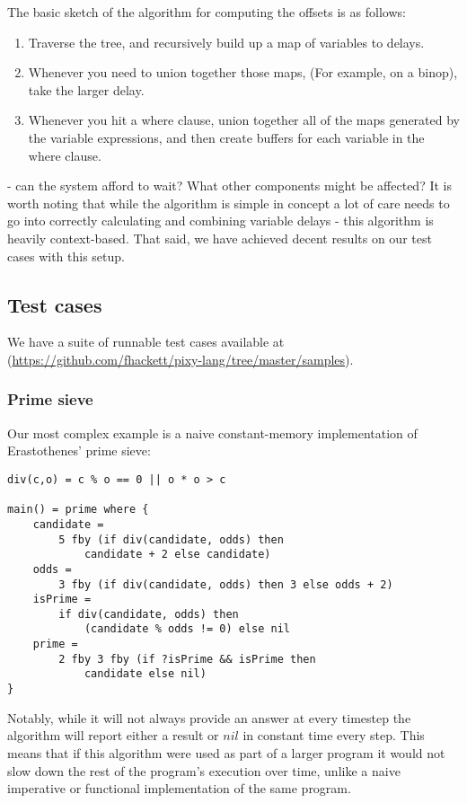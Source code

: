\documentclass{scrartcl}
\begin{document}
    The basic sketch of the algorithm for computing the offsets is as follows:
    \begin{enumerate}
        \item Traverse the tree, and recursively build up a map of variables to delays.
        \item Whenever you need to union together those maps, (For example, on a binop), take the 
            larger delay.
        \item Whenever you hit a where clause, union together all of the maps generated by the variable
            expressions, and then create buffers for each variable in the where clause.
    \end{enumerate}
- can the system afford to wait? What other components might be affected?
    It is worth noting that while the algorithm is simple in concept a lot of care needs to go into correctly calculating and combining variable delays - this algorithm is heavily context-based. That said, we have achieved decent results on our test cases with this setup.

    \subsection{Test cases}
    
    We have a suite of runnable test cases available at (\url{https://github.com/fhackett/pixy-lang/tree/master/samples}).
    
    \subsubsection{Prime sieve}
    
    Our most complex example is a naive constant-memory implementation of Erastothenes' prime sieve:
    
    \begin{lstlisting}
div(c,o) = c % o == 0 || o * o > c

main() = prime where {
    candidate =
        5 fby (if div(candidate, odds) then
            candidate + 2 else candidate)
    odds =
        3 fby (if div(candidate, odds) then 3 else odds + 2)
    isPrime =
        if div(candidate, odds) then
            (candidate % odds != 0) else nil
    prime =
        2 fby 3 fby (if ?isPrime && isPrime then
            candidate else nil)
}
    \end{lstlisting}
    
    Notably, while it will not always provide an answer at every timestep the algorithm will report either a result or $nil$ in constant time every step. This means that if this algorithm were used as part of a larger program it would not slow down the rest of the program's execution over time, unlike a naive imperative or functional implementation of the same program.
    
\end{document}
